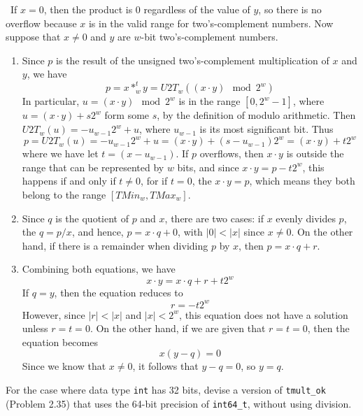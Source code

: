 \documentclass[12pt]{article}
\newenvironment{ex}[2][Exercise]{\begin{trivlist}
		\item[\hskip \labelsep {\bfseries #1}\hskip \labelsep {\bfseries #2.}]}{\end{trivlist}}
\newenvironment{sol}[1][Solution]{\begin{trivlist}
		\item[\hskip \labelsep {\bfseries #1:}]}{\end{trivlist}}
\begin{document}
\begin{sol}
	\
	If $x=0$, then the product is 0 regardless of the value of $y$, so there is no
	overflow because $x$ is in the valid range for two's-complement numbers.
	Now suppose that $x\neq 0$ and $y$ are $w$-bit two's-complement numbers.
	\begin{enumerate}
		\item Since $p$ is the result of the unsigned two's-complement
		multiplication of $x$ and $y$, we have
		\[
		p=x*_w^ty=U2T_w((x\cdot y)\mod 2^w)
		\]
		In particular, $u=(x\cdot y)\mod 2^w$ is in the range $[0, 2^w-1]$,
		where $u=(x\cdot y)+s 2^w$ form some $s$, by the definition of modulo
		arithmetic. Then $U2T_w(u)=-u_{w-1}2^w+u$, where $u_{w-1}$ is its
		most significant bit. Thus
		\[
		p=U2T_w(u)=-u_{w-1}2^{w}+u=(x\cdot y)+(s-u_{w-1})2^w=(x\cdot y)+t2^w
		\]
		where we have let $t=(x-u_{w-1})$. If $p$ overflows, then $x\cdot y$ is outside the range that can be represented by $w$ bits, and
		since $x\cdot y = p - t2^w$, this happens if and only if $t\neq 0$,
		for if $t=0$, the $x\cdot y=p$, which means they both belong to
		the range $[TMin_w, TMax_w]$.
		\item Since $q$ is the quotient of $p$ and $x$, there are two cases:
		if $x$ evenly divides $p$, the $q=p/x$, and hence,
		$p=x\cdot q+0$, with $|0|<|x|$ since $x\neq 0$. On the other hand,
		if there is a remainder when dividing $p$ by $x$, then
		$p=x\cdot q + r$. 
		\item Combining both equations, we have
		\[
		x\cdot y = x\cdot q + r + t2^w
		\]
		If $q=y$, then the equation reduces to
		\[
		r=-t2^w
		\]
		However, since $|r|<|x|$ and $|x|<2^w$, this equation does not
		have a solution unless $r=t=0$. On the other hand, if we are
		given that $r=t=0$, then the equation becomes
		\[
		x(y-q)=0
		\]
		Since we know that $x\neq 0$, it follows that $y-q=0$, so
		$y=q$.
	\end{enumerate}
\end{sol}

\begin{ex}{2.36}
	For the case where data type \texttt{int} has 32 bits, devise a
	version of \texttt{tmult\_ok} (Problem 2.35) that uses the
	64-bit precision of \texttt{int64\_t}, without using division.
\end{ex}
\end{document}

